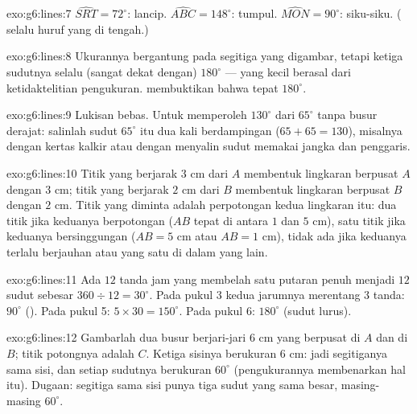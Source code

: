 \begin{solution}{exo:g6:lines:7}
$\widehat{SRT} = 72^\circ$: lancip. \quad
$\widehat{ABC} = 148^\circ$: tumpul. \quad
$\widehat{MON} = 90^\circ$: siku-siku. ( selalu huruf
yang di tengah.)
\end{solution}

\begin{solution}{exo:g6:lines:8}
Ukurannya bergantung pada segitiga yang digambar, tetapi 
ketiga sudutnya selalu (sangat dekat dengan) $180^\circ$ --- 
yang kecil berasal dari ketidaktelitian pengukuran.
 membuktikan bahwa  tepat $180^\circ$.
\end{solution}

\begin{solution}{exo:g6:lines:9}
Lukisan bebas. Untuk memperoleh $130^\circ$ dari $65^\circ$ tanpa
busur derajat: salinlah sudut $65^\circ$ itu dua kali berdampingan
($65 + 65 = 130$), misalnya dengan kertas kalkir atau dengan menyalin
sudut memakai jangka dan penggaris.
\end{solution}

\begin{solution}{exo:g6:lines:10}
Titik yang berjarak $3$ cm dari $A$ membentuk lingkaran berpusat $A$
dengan  $3$ cm; titik yang berjarak $2$ cm dari $B$ membentuk
lingkaran berpusat $B$ dengan  $2$ cm. Titik yang diminta
adalah perpotongan kedua lingkaran itu: dua titik jika keduanya
berpotongan ($AB$ tepat di antara $1$ dan $5$ cm), satu titik jika
keduanya bersinggungan ($AB = 5$ cm atau $AB = 1$ cm), tidak ada jika
keduanya terlalu berjauhan atau yang satu di dalam yang lain.
\end{solution}

\begin{solution}{exo:g6:lines:11}
Ada $12$ tanda jam yang membelah satu putaran penuh menjadi $12$
sudut sebesar $360 \div 12 = 30^\circ$. Pada pukul 3 kedua jarumnya
merentang $3$ tanda: $90^\circ$ (). Pada pukul 5:
$5 \times 30 = 150^\circ$. Pada pukul 6: $180^\circ$ (sudut lurus).
\end{solution}

\begin{solution}{exo:g6:lines:12}
Gambarlah dua busur berjari-jari $6$ cm yang berpusat di $A$ dan di
$B$; titik potongnya adalah $C$. Ketiga sisinya berukuran $6$ cm: jadi
segitiganya sama sisi, dan setiap sudutnya berukuran $60^\circ$
(pengukurannya membenarkan hal itu). Dugaan: segitiga sama sisi punya
tiga sudut yang sama besar, masing-masing $60^\circ$.
\end{solution}


